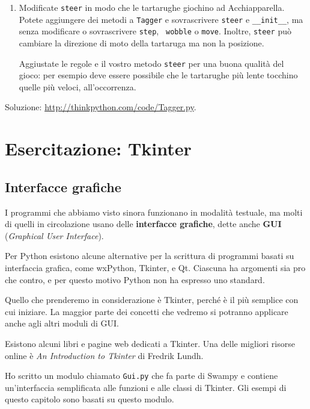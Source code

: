 \documentclass[10pt]{book}
\begin{document}
\begin{exercise}
\begin{enumerate}
\item Modificate {\tt steer} in modo che le tartarughe giochino ad Acchiapparella. Potete aggiungere dei metodi a {\tt Tagger} e sovrascrivere {\tt steer} e
  \verb"__init__", ma senza modificare o sovrascrivere {\tt step}, {\tt
    wobble} o {\tt move}.  Inoltre, {\tt steer} può cambiare la direzione di moto della tartaruga ma non la posizione.

Aggiustate le regole e il vostro metodo {\tt steer} per una buona qualità del gioco: per esempio deve essere possibile che le tartarughe più lente tocchino quelle più veloci, all'occorrenza.

\end{enumerate}

Soluzione: \url{http://thinkpython.com/code/Tagger.py}.
\end{exercise}



\chapter{Esercitazione: Tkinter}
\label{tkinter}

\section{Interfacce grafiche}

I programmi che abbiamo visto sinora funzionano in modalità testuale, ma molti di quelli in circolazione usano delle {\bf interfacce grafiche}, dette anche {\bf GUI} ({\em Graphical User Interface}).

Per Python esistono alcune alternative per la scrittura di programmi basati su interfaccia grafica, come wxPython, Tkinter, e Qt. Ciascuna ha argomenti sia pro che contro, e per questo motivo Python non ha espresso uno standard.

Quello che prenderemo in considerazione è Tkinter, perché è il più semplice con cui iniziare. La maggior parte dei concetti che vedremo si potranno applicare anche agli altri moduli di GUI.

Esistono alcuni libri e pagine web dedicati a Tkinter. Una delle migliori risorse online è {\em An Introduction to Tkinter} di Fredrik Lundh.

Ho scritto un modulo chiamato {\tt Gui.py} che fa parte di Swampy e contiene un'interfaccia semplificata alle funzioni e alle classi di Tkinter. Gli esempi di questo capitolo sono basati su questo modulo.
\end{document}
